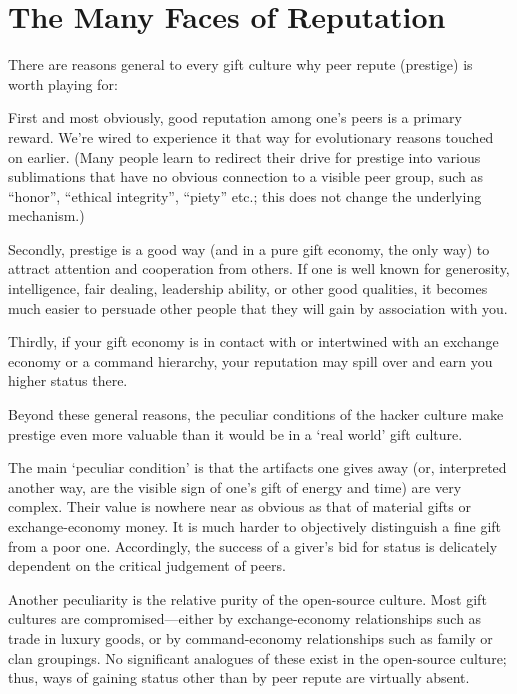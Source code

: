 \section{The Many Faces of Reputation}


There are reasons general to every gift culture why peer repute (prestige) is
worth playing for:

First and most obviously, good reputation among one's peers is a primary reward.
We're wired to experience it that way for evolutionary reasons touched on
earlier.  (Many people learn to redirect their drive for prestige into various
sublimations that have no obvious connection to a visible peer group, such as
``honor'', ``ethical integrity'', ``piety'' etc.; this does not change the
underlying mechanism.)

Secondly, prestige is a good way (and in a pure gift economy, the only way) to
attract attention and cooperation from others.  If one is well known for
generosity, intelligence, fair dealing, leadership ability, or other good
qualities, it becomes much easier to persuade other people that they will gain
by association with you.

Thirdly, if your gift economy is in contact with or intertwined with an exchange
economy or a command hierarchy, your reputation may spill over and earn you
higher status there.

Beyond these general reasons, the peculiar conditions of the hacker culture make
prestige even more valuable than it would be in a `real world' gift culture.

The main `peculiar condition' is that the artifacts one gives away (or,
interpreted another way, are the visible sign of one's gift of energy and time)
are very complex.  Their value is nowhere near as obvious as that of material
gifts or exchange-economy money.  It is much harder to objectively distinguish a
fine gift from a poor one.  Accordingly, the success of a giver's bid for status
is delicately dependent on the critical judgement of peers.

Another peculiarity is the relative purity of the open-source culture.  Most
gift cultures are compromised—either by exchange-economy relationships such as
trade in luxury goods, or by command-economy relationships such as family or
clan groupings.  No significant analogues of these exist in the open-source
culture; thus, ways of gaining status other than by peer repute are virtually
absent.
